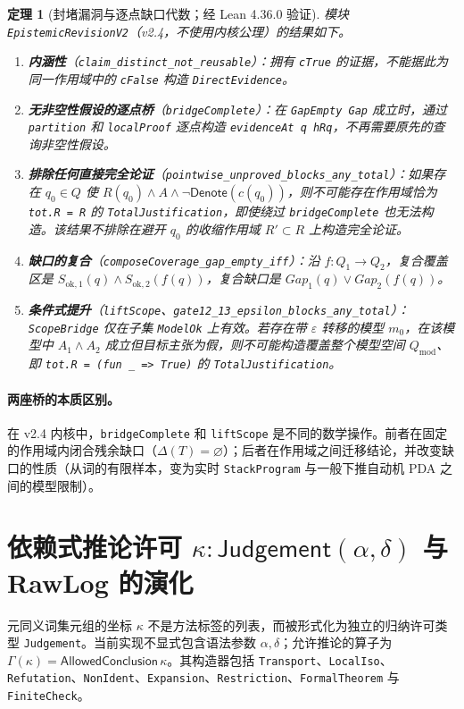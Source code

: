 \documentclass[11pt,a4paper,UTF8,fontset=fandol]{ctexart}
\newtheorem{theorem}{定理}[section]
\DeclareRobustCommand{\id}[1]{\nolinkurl{#1}}
\newcommand{\Gap}{\mathit{Gap}}
\newcommand{\Denote}{\mathsf{Denote}}
\begin{document}
\begin{theorem}[封堵漏洞与逐点缺口代数；经 Lean 4.36.0 验证]
模块 \id{EpistemicRevisionV2}（v2.4，不使用内核公理）的结果如下。
\begin{enumerate}
\item \textbf{内涵性}（\id{claim_distinct_not_reusable}）：拥有 \id{cTrue} 的证据，不能据此为同一作用域中的 \id{cFalse} 构造 \id{DirectEvidence}。
\item \textbf{无非空性假设的逐点桥}（\id{bridgeComplete}）：在 \id{GapEmpty Gap} 成立时，通过 \id{partition} 和 \id{localProof} 逐点构造 \id{evidenceAt q hRq}，不再需要原先的查询非空性假设。
\item \textbf{排除任何直接完全论证}（\id{pointwise_unproved_blocks_any_total}）：如果存在 $q_0\in Q$ 使 $R(q_0)\land A\land\neg\Denote(c(q_0))$，则不可能存在作用域恰为 \id{tot.R = R} 的 \id{TotalJustification}，即使绕过 \id{bridgeComplete} 也无法构造。该结果不排除在避开 $q_0$ 的收缩作用域 $R'\subset R$ 上构造完全论证。
\item \textbf{缺口的复合}（\id{composeCoverage_gap_empty_iff}）：沿 $f:Q_1\to Q_2$，复合覆盖区是 $S_{\mathrm{ok},1}(q)\land S_{\mathrm{ok},2}(f(q))$，复合缺口是 $\Gap_1(q)\lor\Gap_2(f(q))$。
\item \textbf{条件式提升}（\id{liftScope}、\id{gate12_13_epsilon_blocks_any_total}）：\id{ScopeBridge} 仅在子集 \id{ModelOk} 上有效。若存在带 $\varepsilon$ 转移的模型 $m_0$，在该模型中 $A_1\land A_2$ 成立但目标主张为假，则不可能构造覆盖整个模型空间 $Q_{\mathrm{mod}}$、即 \id{tot.R = (fun _ => True)} 的 \id{TotalJustification}。
\end{enumerate}
\end{theorem}

\paragraph{两座桥的本质区别。}
在 v2.4 内核中，\id{bridgeComplete} 和 \id{liftScope} 是不同的数学操作。前者在固定的作用域内闭合残余缺口（$\Delta(T)=\varnothing$）；后者在作用域之间迁移结论，并改变缺口的性质（从词的有限样本，变为实时 \id{StackProgram} 与一般下推自动机 PDA 之间的模型限制）。

\section{依赖式推论许可 \texorpdfstring{$\kappa:\mathsf{Judgement}(\alpha,\delta)$}{κ: Judgement(α,δ)} 与 RawLog 的演化}\label{sec:lic}
元同义词集元组的坐标 $\kappa$ 不是方法标签的列表，而被形式化为独立的归纳许可类型 \id{Judgement}。当前实现不显式包含语法参数 $\alpha,\delta$；允许推论的算子为 $\Gamma(\kappa)=\mathsf{AllowedConclusion}\,\kappa$。其构造器包括 \id{Transport}、\id{LocalIso}、\id{Refutation}、\id{NonIdent}、\id{Expansion}、\id{Restriction}、\id{FormalTheorem} 与 \id{FiniteCheck}。
\end{document}
